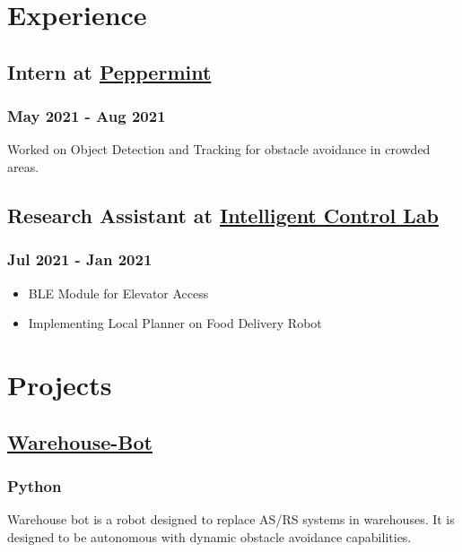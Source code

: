 \documentclass[letterpaper]{article}
\author{Sudhanv Apte}
\date{\today}
\title{}
\begin{document}

\section{Experience}
\label{sec:org441382b}
\subsection{Intern at \href{http://getpeppermint.co}{Peppermint}}
\label{sec:org693e49f}
\subsubsection{May 2021 - Aug 2021}
\label{sec:org06c423b}
Worked on Object Detection and Tracking for obstacle avoidance in crowded areas.
\subsection{Research Assistant at \href{https://itlab.ee.ntut.edu.tw/}{Intelligent Control Lab}}
\label{sec:org65adc16}
\subsubsection{Jul 2021 - Jan 2021}
\label{sec:orgcb3f734}
\begin{itemize}
\item BLE Module for Elevator Access
\item Implementing Local Planner on Food Delivery Robot
\end{itemize}

\section{Projects}
\label{sec:org2264f8a}
\subsection{\href{https://github.com/sudhanv09/Warehouse-Bot}{Warehouse-Bot}}
\label{sec:org753be5e}
\subsubsection{Python}
\label{sec:org72fc07a}
Warehouse bot is a robot designed to replace AS/RS systems in warehouses. It is
designed to be autonomous with dynamic obstacle avoidance capabilities.
\end{document}
